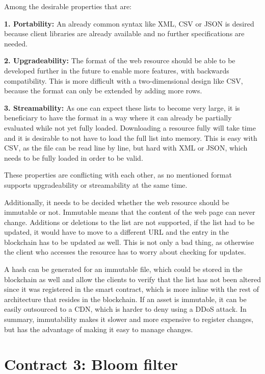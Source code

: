 Among the desirable properties that are:

\textbf{1. Portability:} An already common syntax like XML, CSV or JSON is desired because client libraries are already available and no further specifications are needed.

\textbf{2. Upgradeability:} The format of the web resource should be able to be developed further in the future to enable more features, with backwards compatibility. This is more difficult with a two-dimensional design like CSV, because the format can only be extended by adding more rows.

\textbf{3. Streamability:} As one can expect these lists to become very large, it is beneficiary to have the format in a way where it can already be partially evaluated while not yet fully loaded. Downloading a resource fully will take time and it is desirable to not have to load the full list into memory. This is easy with CSV, as the file can be read line by line, but hard with XML or JSON, which needs to be fully loaded in order to be valid.


These properties are conflicting with each other, as no mentioned format supports upgradeability or streamability at the same time.

Additionally, it needs to be decided whether the web resource should be immutable or not. Immutable means that the content of the web page can never change. Additions or deletions to the list are not supported, if the list had to be updated, it would have to move to a different URL and the entry in the blockchain has to be updated as well. This is not only a bad thing, as otherwise the client who accesses the resource has to worry about checking for updates.

A hash can be generated for an immutable file, which could be stored in the blockchain as well and allow the clients to verify that the list has not been altered since it was registered in the smart contract, which is more inline with the rest of architecture that resides in the blockchain. If an asset is immutable, it can be easily outsourced to a CDN, which is harder to deny using a DDoS attack.
In summary, immutability makes it slower and more expensive to register changes, but has the advantage of making it easy to manage changes.

\section{Contract 3: Bloom filter}

